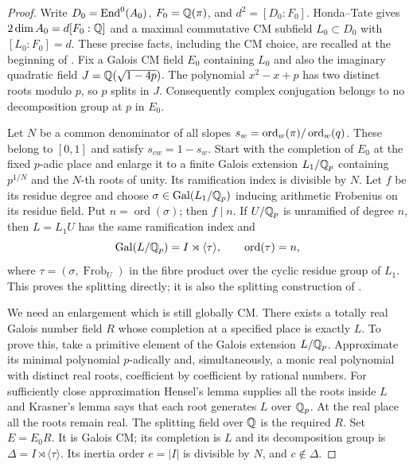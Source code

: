 \begin{proof}
Write $D_0=\operatorname{End}^0(A_0)$, $F_0=\mathbb Q(\pi)$, and
$d^2=[D_0:F_0]$.  Honda--Tate gives
$2\dim A_0=d[F_0:\mathbb Q]$ and a maximal commutative CM subfield
$L_0\subset D_0$ with $[L_0:F_0]=d$.  These precise facts, including
the CM choice, are recalled at the beginning of
\citet[\S2, p.~7]{DCCO2008}.  Fix a Galois CM field $E_0$ containing
$L_0$ and also the imaginary quadratic field
$J=\mathbb Q(\sqrt{1-4p})$.  The polynomial $x^2-x+p$ has two distinct
roots modulo $p$, so $p$ splits in $J$.  Consequently complex
conjugation belongs to no decomposition group at $p$ in $E_0$.

Let $N$ be a common denominator of all slopes
$s_w=\operatorname{ord}_w(\pi)/\operatorname{ord}_w(q)$.  These belong to $[0,1]$ and satisfy
$s_{cw}=1-s_w$.  Start with the completion of $E_0$ at the fixed
$p$-adic place and enlarge it to a finite Galois extension $L_1/\mathbb Q_p$
containing $p^{1/N}$ and the $N$-th roots of unity.  Its ramification
index is divisible by $N$.  Let $f$ be its residue degree and choose
$\sigma\in\operatorname{Gal}(L_1/\mathbb Q_p)$ inducing arithmetic Frobenius on its
residue field.  Put $n=\operatorname{ord}(\sigma)$; then $f\mid n$.
If $U/\mathbb Q_p$ is unramified of degree $n$, then
$L=L_1U$ has the same ramification index and
\[
 \operatorname{Gal}(L/\mathbb Q_p)=I\rtimes\langle\tau\rangle,
 \qquad\operatorname{ord}(\tau)=n,
\]
where $\tau=(\sigma,\operatorname{Frob}_U)$ in the fibre product
over the cyclic residue group of $L_1$.  This proves the splitting
directly; it is also the splitting construction of
\citet[Remark 4.12 and Lemma 6.1]{DCCO2008}.

We need an enlargement which is still globally CM.  There exists a
totally real Galois number field $R$ whose completion at a specified
place is exactly $L$.  To prove this, take a primitive element of
the Galois extension $L/\mathbb Q_p$.  Approximate its minimal polynomial
$p$-adically and, simultaneously, a monic real polynomial with
distinct real roots, coefficient by coefficient by rational numbers.
For sufficiently close approximation Hensel's lemma supplies all
the roots inside $L$ and Krasner's lemma says that each root
generates $L$ over $\mathbb Q_p$.  At the real place all the roots remain
real.  The splitting field over $\mathbb Q$ is the required $R$.
Set $E=E_0R$.  It is Galois CM; its completion is $L$ and its
decomposition group is $\Delta=I\rtimes\langle\tau\rangle$.
Its inertia order $e=|I|$ is divisible by $N$, and $c\notin\Delta$.


\end{proof}
